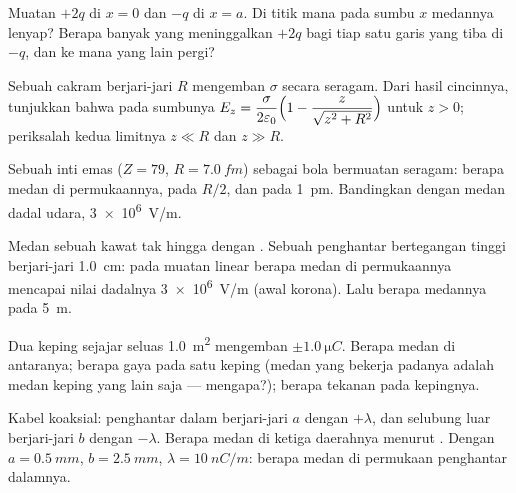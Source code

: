 \begin{exercise}[$\star$]\label{exo:b1:electrostatics-gauss:4}
Muatan $+2q$ di $x = 0$ dan $-q$ di $x = a$. Di titik mana pada sumbu $x$
medannya lenyap? Berapa banyak  yang meninggalkan $+2q$ bagi tiap satu garis
yang tiba di $-q$, dan ke mana yang lain pergi?
\end{exercise}

\begin{exercise}[$\star\star$]\label{exo:b1:electrostatics-gauss:5}
Sebuah cakram berjari-jari $R$ mengemban $\sigma$ secara seragam. Dari hasil cincinnya,
tunjukkan bahwa pada sumbunya $E_z = \dfrac{\sigma}{2\varepsilon_0}\Bigl(1 - \dfrac{z}{\sqrt{z^2 +
R^2}}\Bigr)$ untuk $z > 0$; periksalah kedua limitnya $z \ll R$ dan $z \gg R$.
\end{exercise}

\begin{exercise}[$\star\star$]\label{exo:b1:electrostatics-gauss:6}
Sebuah inti emas ($Z = 79$, $R = \qty{7.0}{fm}$) sebagai bola bermuatan
seragam: berapa medan di permukaannya, pada $R/2$, dan pada \qty{1}{pm}. Bandingkan dengan
medan dadal udara, \qty{3e6}{V/m}.
\end{exercise}

\begin{exercise}[$\star\star$]\label{exo:b1:electrostatics-gauss:7}
Medan sebuah kawat tak hingga dengan . Sebuah penghantar bertegangan tinggi
berjari-jari \qty{1.0}{cm}: pada muatan linear berapa medan di permukaannya
mencapai nilai dadalnya \qty{3e6}{V/m} (awal korona). Lalu berapa medannya pada
\qty{5}{m}.
\end{exercise}

\begin{exercise}[$\star\star$]\label{exo:b1:electrostatics-gauss:8}
Dua keping sejajar seluas \qty{1.0}{m^2} mengemban $\pm\qty{1.0}{\micro C}$.
Berapa medan di antaranya; berapa gaya pada satu keping (medan yang bekerja padanya adalah medan
keping yang lain saja --- mengapa?); berapa tekanan pada kepingnya.
\end{exercise}

\begin{exercise}[$\star\star$]\label{exo:b1:electrostatics-gauss:9}
Kabel koaksial: penghantar dalam berjari-jari $a$ dengan $+\lambda$, dan selubung
luar berjari-jari $b$ dengan $-\lambda$. Berapa medan di ketiga daerahnya menurut
. Dengan $a = \qty{0.5}{mm}$, $b = \qty{2.5}{mm}$, $\lambda = \qty{10}{nC/m}$:
berapa medan di permukaan penghantar dalamnya.
\end{exercise}

